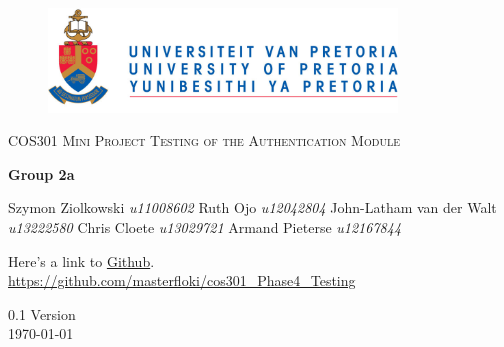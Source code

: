 \begin{titlepage}
	\begin{center}
		
		\begin{figure}[t]
			\centering		
			
			\includegraphics[width=350px]{UP_Logo.png}
		\end{figure}
		
		\textsc{\LARGE COS301 Mini Project \newline\newline Testing of the Authentication Module}
		
		\textbf{\newline Group 2a} \\
		\begin{flushright} \large
			Szymon Ziolkowski \emph{u11008602} \newline
			Ruth Ojo \emph{u12042804} \newline
			John-Latham van der Walt \emph{u13222580} \newline
			Chris Cloete \emph{u13029721} \newline
			Armand Pieterse \emph{u12167844} \newline
		\end{flushright}
		
		\vfill
		
	Here's a link to \href{https://github.com/masterfloki/cos301_Phase4_Testing}{Github}.\\
	\url{https://github.com/masterfloki/cos301_Phase4_Testing}

	\vfill

	{\large 0.1 Version}
	\\
	{\large \today}		
		
		
	\end{center}
\end{titlepage}
